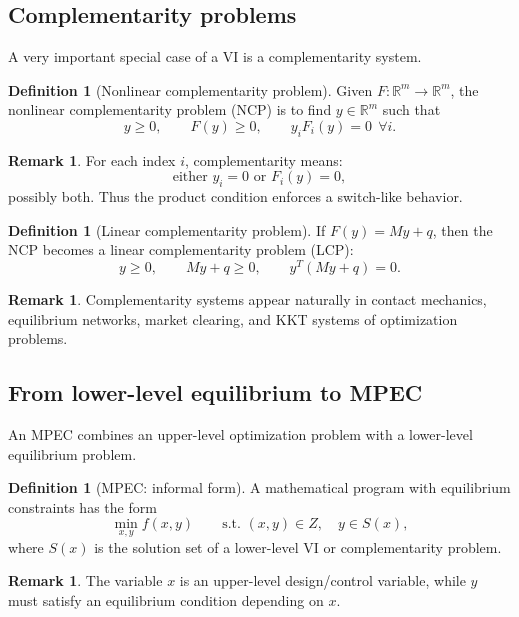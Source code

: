 \documentclass[pdflatex,sn-mathphys-num]{sn-jnl}%
\theoremstyle{definition}
\newtheorem{definition}[theorem]{Definition}
\newtheorem{remark}[theorem]{Remark}
\begin{document}
\subsection{Complementarity problems}

A very important special case of a VI is a complementarity system.

\begin{definition}[Nonlinear complementarity problem]
Given $F:\mathbb{R}^m\to\mathbb{R}^m$, the nonlinear complementarity
problem (NCP) is to find $y\in\mathbb{R}^m$ such that
\[
y\ge 0,\qquad F(y)\ge 0,\qquad y_iF_i(y)=0\ \ \forall i.
\]
\end{definition}

\begin{remark}
For each index $i$, complementarity means:
\[
\text{either } y_i=0 \text{ or } F_i(y)=0,
\]
possibly both. Thus the product condition enforces a switch-like behavior.
\end{remark}

\begin{definition}[Linear complementarity problem]
If $F(y)=My+q$, then the NCP becomes a linear complementarity problem
(LCP):
\[
y\ge 0,\qquad My+q\ge 0,\qquad y^T(My+q)=0.
\]
\end{definition}

\begin{remark}
Complementarity systems appear naturally in contact mechanics,
equilibrium networks, market clearing, and KKT systems of optimization
problems.
\end{remark}

\subsection{From lower-level equilibrium to MPEC}

An MPEC combines an upper-level optimization problem with a lower-level
equilibrium problem.

\begin{definition}[MPEC: informal form]
A mathematical program with equilibrium constraints has the form
\[
\min_{x,y} f(x,y)
\qquad
\text{s.t. } (x,y)\in Z,\quad y\in S(x),
\]
where $S(x)$ is the solution set of a lower-level VI or complementarity
problem.
\end{definition}

\begin{remark}
The variable $x$ is an upper-level design/control variable, while $y$
must satisfy an equilibrium condition depending on $x$.
\end{remark}
\end{document}
